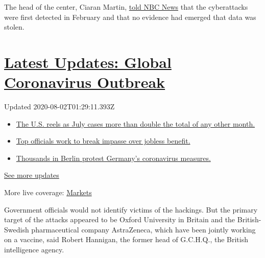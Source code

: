 The head of the center, Ciaran Martin,
\href{https://www.nbcnews.com/news/world/russia-attempting-steal-coronavirus-vaccine-research-u-s-u-k-n1234021}{told
NBC News} that the cyberattacks were first detected in February and that
no evidence had emerged that data was stolen.

\hypertarget{latest-updates-global-coronavirus-outbreak}{%
\section{\texorpdfstring{\href{https://www.nytimes.com/2020/08/01/world/coronavirus-covid-19.html?action=click\&pgtype=Article\&state=default\&region=MAIN_CONTENT_1\&context=storylines_live_updates}{Latest
Updates: Global Coronavirus
Outbreak}}{Latest Updates: Global Coronavirus Outbreak}}\label{latest-updates-global-coronavirus-outbreak}}

Updated 2020-08-02T01:29:11.393Z

\begin{itemize}
\tightlist
\item
  \href{https://www.nytimes.com/2020/08/01/world/coronavirus-covid-19.html?action=click\&pgtype=Article\&state=default\&region=MAIN_CONTENT_1\&context=storylines_live_updates\#link-34047410}{The
  U.S. reels as July cases more than double the total of any other
  month.}
\item
  \href{https://www.nytimes.com/2020/08/01/world/coronavirus-covid-19.html?action=click\&pgtype=Article\&state=default\&region=MAIN_CONTENT_1\&context=storylines_live_updates\#link-3ac56579}{Top
  officials work to break impasse over jobless benefit.}
\item
  \href{https://www.nytimes.com/2020/08/01/world/coronavirus-covid-19.html?action=click\&pgtype=Article\&state=default\&region=MAIN_CONTENT_1\&context=storylines_live_updates\#link-25930521}{Thousands
  in Berlin protest Germany's coronavirus measures.}
\end{itemize}

\href{https://www.nytimes.com/2020/08/01/world/coronavirus-covid-19.html?action=click\&pgtype=Article\&state=default\&region=MAIN_CONTENT_1\&context=storylines_live_updates}{See
more updates}

More live coverage:
\href{https://www.nytimes.com/live/2020/07/31/business/stock-market-today-coronavirus?action=click\&pgtype=Article\&state=default\&region=MAIN_CONTENT_1\&context=storylines_live_updates}{Markets}

Government officials would not identify victims of the hackings. But the
primary target of the attacks appeared to be Oxford University in
Britain and the British-Swedish pharmaceutical company AstraZeneca,
which have been jointly working on a vaccine, said Robert Hannigan, the
former head of G.C.H.Q., the British intelligence agency.


